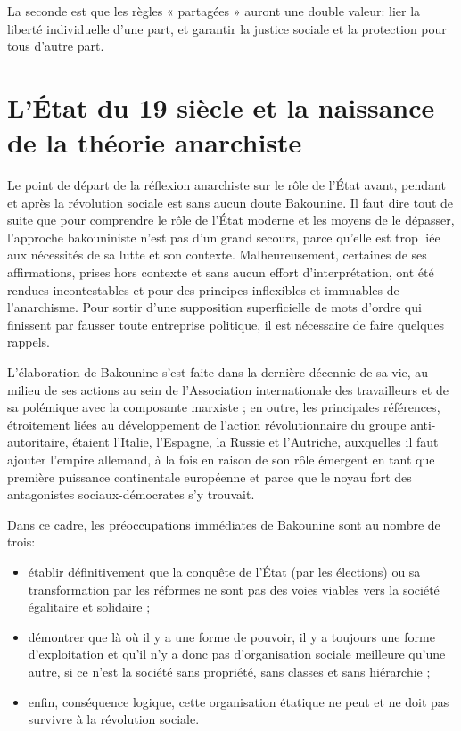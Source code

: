 La seconde est que les règles « partagées » auront une double valeur: lier la liberté individuelle d'une part, et garantir la justice sociale et la protection pour tous d'autre part.

\chapter{L'État du 19\ieme{} siècle et la naissance de la théorie anarchiste}

Le point de départ de la réflexion anarchiste sur le rôle de l'État avant, pendant et après la révolution sociale est sans aucun doute Bakounine. Il faut dire tout de suite que pour comprendre le rôle de l'État moderne et les moyens de le dépasser, l'approche bakouniniste n'est pas d'un grand secours, parce qu'elle est trop liée aux nécessités de sa lutte et son contexte. Malheureusement, certaines de ses affirmations, prises hors contexte et sans aucun effort d'interprétation, ont été rendues incontestables et pour des principes inflexibles et immuables de l'anarchisme. Pour sortir d'une supposition superficielle de mots d'ordre qui finissent par fausser toute entreprise politique, il est nécessaire de faire quelques rappels.

L'élaboration de Bakounine s'est faite dans la dernière décennie de sa vie, au milieu de ses actions au sein de l'Association internationale des travailleurs et de sa polémique avec la composante marxiste ; en outre, les principales références, étroitement liées au développement de l'action révolutionnaire du groupe anti-autoritaire, étaient l'Italie, l'Espagne, la Russie et l'Autriche, auxquelles il faut ajouter l'empire allemand, à la fois en raison de son rôle émergent en tant que première puissance continentale européenne et parce que le noyau fort des antagonistes sociaux-démocrates s'y trouvait.

Dans ce cadre, les préoccupations immédiates de Bakounine sont au nombre de trois:

\begin{itemize}
\item établir définitivement que la conquête de l'État (par les élections) ou sa transformation par les réformes ne sont pas des voies viables vers la société égalitaire et solidaire ;
\item démontrer que là où il y a une forme de pouvoir, il y a toujours une forme d'exploitation et qu'il n'y a donc pas d'organisation sociale meilleure qu'une autre, si ce n'est la société sans propriété, sans classes et sans hiérarchie ;
\item enfin, conséquence logique, cette organisation étatique ne peut et ne doit pas survivre à la révolution sociale.
\end{itemize}

